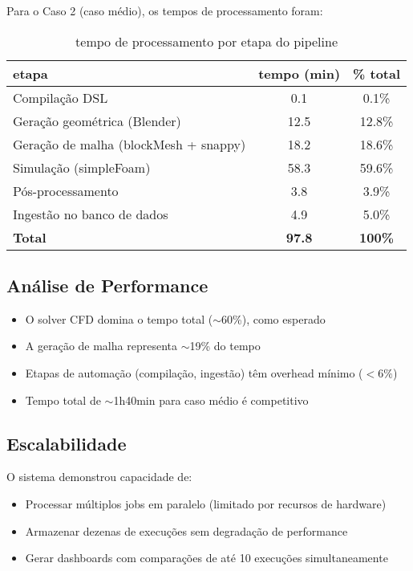 Para o Caso 2 (caso médio), os tempos de processamento foram:

\begin{table}[htb]
\centering
\caption{tempo de processamento por etapa do pipeline}
\label{tab:performance}
\begin{tabular}{lcc}
\toprule
\textbf{etapa} & \textbf{tempo (min)} & \textbf{\% total} \\
\midrule
Compilação DSL & 0.1 & 0.1\% \\
Geração geométrica (Blender) & 12.5 & 12.8\% \\
Geração de malha (blockMesh + snappy) & 18.2 & 18.6\% \\
Simulação (simpleFoam) & 58.3 & 59.6\% \\
Pós-processamento & 3.8 & 3.9\% \\
Ingestão no banco de dados & 4.9 & 5.0\% \\
\midrule
\textbf{Total} & \textbf{97.8} & \textbf{100\%} \\
\bottomrule
\end{tabular}
\end{table}

\subsection{Análise de Performance}

\begin{itemize}
    \item O solver CFD domina o tempo total ($\sim$60\%), como esperado
    \item A geração de malha representa $\sim$19\% do tempo
    \item Etapas de automação (compilação, ingestão) têm overhead mínimo ($< 6\%$)
    \item Tempo total de $\sim$1h40min para caso médio é competitivo
\end{itemize}

\subsection{Escalabilidade}

O sistema demonstrou capacidade de:
\begin{itemize}
    \item Processar múltiplos jobs em paralelo (limitado por recursos de hardware)
    \item Armazenar dezenas de execuções sem degradação de performance
    \item Gerar dashboards com comparações de até 10 execuções simultaneamente
\end{itemize}

